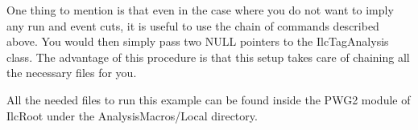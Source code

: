 One thing to mention is that even in the case where you do not want to imply any run and event cuts, it is useful to use the chain of commands described above. You would then simply pass two {\ttfamily NULL} pointers to the {\ttfamily IlcTagAnalysis} class. The advantage of this procedure is that this setup takes care of chaining all the necessary files for you.

All the needed files to run this example can be found inside the PWG2 module of IlcRoot under the AnalysisMacros/Local directory.


